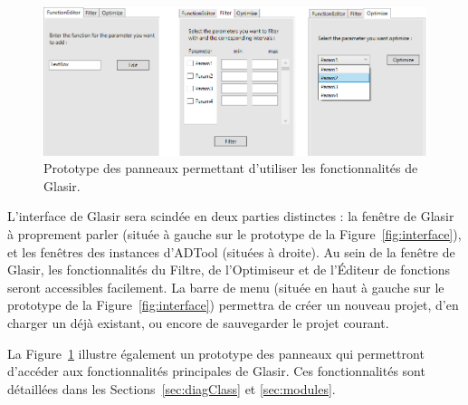     \begin{figure}[h!]
        \centering
        \includegraphics[height=0.42\textwidth]{figure/ongletsGlasir.png}
        \caption{Prototype des panneaux permettant d'utiliser les fonctionnalités de Glasir.}
        \label{fig:panneaux}
    \end{figure}
    
L'interface de Glasir sera scindée en deux parties distinctes : la fenêtre de Glasir à proprement parler (située à gauche sur le prototype de la {\sc Figure}~\ref{fig:interface}), et les fenêtres des instances d'ADTool (situées à droite). Au sein de la fenêtre de Glasir, les fonctionnalités du Filtre, de l'Optimiseur et de l'Éditeur de fonctions seront accessibles facilement. La barre de menu (située en haut à gauche sur le prototype de la {\sc Figure}~\ref{fig:interface}) permettra de créer un nouveau projet, d'en charger un déjà existant, ou encore de sauvegarder le projet courant.
    
    La {\sc Figure}~\ref{fig:panneaux} illustre également un prototype des panneaux qui permettront d'accéder aux fonctionnalités principales de Glasir. Ces fonctionnalités sont détaillées dans les {\sc Sections}~\ref{sec:diagClass} et \ref{sec:modules}.  